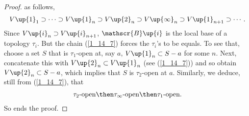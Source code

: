 \begin{proof}
as follows,
%
  \begin{align}\label{1_14_7}
    V\up{1}_1 
      \supset
    \cdots 
      \supset 
    V\up{1}_n
      \supset 
    V\up{2}_n 
      \supset 
    V\up{\infty}_n 
      \supset 
    V\up{1}_{n+1} 
      \supset 
    \cdots .
  \end{align}
%
Since 
  $V\up{i}_n\supset V\up{i}_{n+1}$, 
$\mathscr{B}\up{i}$ is the local base of a topology $\tau_i$. 
But the chain (\ref{1_14_7}) forces the $\tau_i$'s to be equals. 
To see that, choose a set $S$ that is $\tau_1$-open at, say $a$, \ie 
%
  $V\up{1}_n \subset S-a$  
%
for some $n$. Next, concatenate this with $V\up{2}_n \subset V\up{1}_n$ (see (\ref{1_14_7})) and so obtain  
%
  $V\up{2}_n \subset S-a$, 
%
which implies that $S$ is $\tau_2$-open at $a$.
Similarly, we deduce, still from (\ref{1_14_7}), that 
\begin{align}
  \tau_2\text{-open} 
    \then 
  \tau_\infty\text{-open} 
    \then 
  \tau_1\text{-open}.
\end{align}
So ends the proof.
\end{proof}





